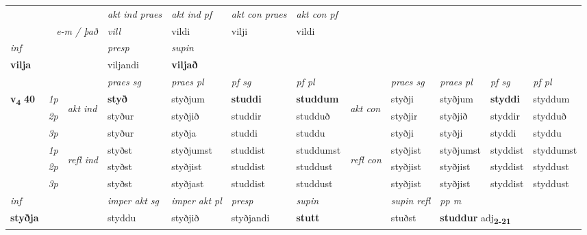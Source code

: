 \begin{longtable}[l]{X>{\footnotesize\itshape}llXXXXlXXXX}
   && &  \textit{akt ind praes} & \textit{akt ind pf} & \textit{akt con praes} & \textit{akt con pf} \\*
\multicolumn{3}{r}{\textit{e-m / það}} & vill & vildi & vilji & vildi \\*

\cmidrule{4-7}
   {\textit{inf}} & &     & \textit{presp} & \textit{supin}   \\*
  {\textbf{vilja}} & &     & viljandi &  \textbf{viljað}   \\*

\midrule

 & &   & \textit{praes sg}  & \textit{praes pl}    & \textit{ pf sg} & \textit{pf pl} & & \textit{praes sg}  & \textit{praes pl}    & \textit{pf sg} & \textit{pf pl }  \\ \cmidrule{4-7} \cmidrule{9-12}
 \multirow{2}{*}{{{\textbf{v{\textsubscript{4}}} \Large{\textbf{40}}}}}  & 1p & \multirow{3}{*}{\begin{turn}{90}\textit{akt ind}\end{turn}} & \textbf{styð} & styðjum & \textbf{studdi} & \textbf{studdum} & \multirow{3}{*}{\begin{turn}{90}\textit{akt con}\end{turn}} &styðji & styðjum & \textbf{styddi} & styddum\\*
 & 2p &  &  styður  & styðjið & studdir & studduð & & styðjir & styðjið & styddir & stydduð \\*
 & 3p &  & styður & styðja & studdi & studdu & & styðji & styðji& styddi & styddu \\*
\cmidrule{4-7} \cmidrule{9-12}
 & 1p & \multirow{3}{*}{\begin{turn}{90}\textit{refl ind}\end{turn}}  & styðst & styðjumst & studdist & studdumst & \multirow{3}{*}{\begin{turn}{90}\textit{refl con}\end{turn}}  &styðjist & styðjumst & styddist & styddumst \\*
 & 2p &  & styðst & styðjist & studdist & studdust & &styðjist & styðjist & styddist & styddust \\*
 & 3p  & & styðst & styðjast & studdist & studdust & & styðjist & styðjist& styddist & styddust \\*
\cmidrule{4-7} \cmidrule{9-12}

   {\textit{inf}} & &  & \textit{imper akt sg} & \textit{imper akt pl}   & \textit{presp} & \textit{supin} && \textit{supin refl} & \textit{pp m} \\*
  {\textbf{styðja}} & && styddu  & styðjið   & styðjandi &  \textbf{stutt} && stuðst & \multicolumn{2}{l}{\textbf{studdur} adj\textbf{\textsubscript{2-21}}} \\*


\end{longtable}
